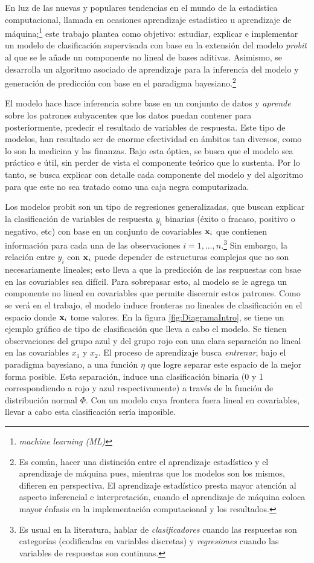 \documentclass[../Main/Main.tex]{subfiles}
\begin{document}
En luz de las nuevas y populares tendencias en el mundo de la estadística computacional, llamada en ocasiones aprendizaje estadístico u aprendizaje de máquina;\footnote{\textit{machine learning (ML)}} este trabajo plantea como objetivo: estudiar, explicar e implementar un modelo de clasificación supervisada con base en la extensión del modelo \textit{probit} al que se le añade un componente no lineal de bases aditivas. Asimismo, se desarrolla un algoritmo asociado de aprendizaje para la inferencia del modelo y generación de predicción con base en el paradigma bayesiano.\footnote{Es común, hacer una distinción entre el aprendizaje estadístico y el aprendizaje de máquina pues, mientras que los modelos son los mismos, difieren en perspectiva. El aprendizaje estadístico presta mayor atención al aspecto inferencial e interpretación, cuando el aprendizaje de máquina coloca mayor énfasis en la implementación computacional y los resultados.}

El modelo hace hace inferencia sobre base en un conjunto de datos y \textit{aprende} sobre los patrones subyacentes que los datos puedan contener para posteriormente, predecir el resultado de variables de respuesta. Este tipo de modelos, han resultado ser de enorme efectividad en ámbitos tan diversos, como lo son la medicina y las finanzas. Bajo esta óptica, se busca que el modelo sea práctico e útil, sin perder de vista el componente teórico que lo sustenta. Por lo tanto, se busca explicar con detalle cada componente del modelo y del algoritmo para que este no sea tratado como una caja negra computarizada.

Los modelos probit son un tipo de regresiones generalizadas, que buscan explicar la clasificación de variables de respuesta $y_i$ binarias (éxito o fracaso, positivo o negativo, etc) con base en un conjunto de covariables $\mathbf{x}_i$ que contienen información para cada una de las observaciones $i = 1,\ldots,n$.\footnote{Es usual en la literatura, hablar de \textit{clasificadores} cuando las respuestas son categorías (codificadas en variables discretas) y \textit{regresiones} cuando las variables de respuestas son continuas.} Sin embargo, la relación entre $y_i$ con $\mathbf{x}_i$ puede depender de estructuras complejas que no son necesariamente lineales; esto lleva a que la predicción de las respuestas con bsae en las covariables sea difícil. Para sobrepasar esto, al modelo se le agrega un componente no lineal en covariables que permite discernir estos patrones. Como se verá en el trabajo, el modelo induce fronteras no lineales de clasificación en el espacio donde $\mathbf{x}_i$ tome valores. En la figura \ref{fig:DiagramaIntro}, se tiene un ejemplo gráfico de tipo de clasificación que lleva a cabo el modelo. Se tienen observaciones del grupo azul y del grupo rojo con una clara separación no lineal en las covariables $x_1$ y $x_2$. El proceso de aprendizaje busca \textit{entrenar}, bajo el paradigma bayesiano, a una función $\eta$ que logre separar este espacio de la mejor forma posible. Esta separación, induce una clasificación binaria (0 y 1 correspondiendo a rojo y azul respectivamente) a través de la función de distribución normal $\Phi$. Con un modelo cuya frontera fuera lineal en covariables, llevar a cabo esta clasificación sería imposible. 
\end{document}
